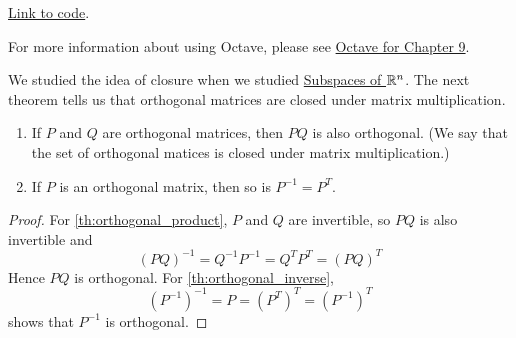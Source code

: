 \documentclass{ximera}
\begin{document}
\begin{exploration}
\href{https://sagecell.sagemath.org/?z=eJx9U01vozAQvVfqf5hLJKjadIFeWsQhWvXYjVB6qaoeXJgEtOAJY7NJ-uvXH0DZ7QdCsj1v3vh5nr24P-4bYqFrkrBlamGDhVvcLm9gzbqiHUnRwIPQXBeoQMgSNqe2RbuewudnYL5V9hxDBFEKV5Eff7jZi4cXPyssfoOuhIbWEo-wgkooYDooHxaMQNOuy6FsEF3ehReahVR7UhisgtgEQhjh-H84-Qf-wJ7DX4oqqOlbOdP1a_34Udu87N1lFIYXdoyn6sFjVSswfwS0hQQK0RR94_ptShOUtAy_EVJLE0BYF1r8QTjUsqTDJy2bpEnidtK2CDaIjs-o-kYr77ANbGtWGroelVXyLoFRaAQxCsjh9QS-Zv1Wyx2gKCp7EFfUSjDz1bBdF2W-19eWEfh5mA6d6OLMGzWizsJ0AJPMuzKCyQzMIYPnLkq7OO2ST65Sbtsr5MybQf6gK595n48nDZ6oN2kn2KEG2bevyMbyxuRYV96QyfZeUYuwb4S9-CdDwOPePI_RW5No2S657B2RqZelaxQzcfgXjCb_iA==&lang=octave&interacts=eJyLjgUAARUAuQ==}{Link to code}.
    
For more information about using Octave, please see \href{https://ximera.osu.edu/linearalgebradzv3/xOctave/OCT_orth/main}{Octave for Chapter 9}.

\end{exploration}

We studied the idea of closure when we studied \href{https://ximera.osu.edu/linearalgebradzv3/LinearAlgebraInteractiveIntro/VSP-0020/main}{Subspaces of $\mathbb{R}^n$}.  The next theorem tells us that orthogonal matrices are closed under matrix multiplication.

\begin{theorem}\label{th:orthogonal_product_inverse}
\begin{enumerate}
    \item\label{th:orthogonal_product}
    If $P$ and $Q$ are orthogonal matrices, then $PQ$ is also orthogonal. (We say that the set of orthogonal matices is closed under matrix multiplication.)
    \item\label{th:orthogonal_inverse}
    If $P$ is an orthogonal matrix, then so is $P^{-1} = P^{T}$.
\end{enumerate}

\begin{proof}
For \ref{th:orthogonal_product}, $P$ and $Q$ are invertible, so $PQ$ is also invertible and
\begin{equation*}
(PQ)^{-1} = Q^{-1}P^{-1} = Q^{T}P^{T} = (PQ)^{T}
\end{equation*}
Hence $PQ$ is orthogonal. For \ref{th:orthogonal_inverse},
\begin{equation*}
(P^{-1})^{-1} = P = (P^{T})^{T} = (P^{-1})^{T}
\end{equation*}
shows that $P^{-1}$ is orthogonal.
\end{proof}
\end{theorem}
\end{document}
